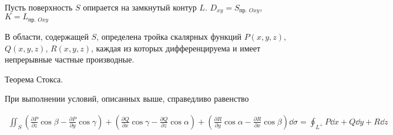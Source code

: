 
\begin{multicols}{2}
  
  \columnbreak

  Пусть поверхность \(S\) опирается на замкнутый контур \(L\).
  \(D_{xy} = S_{\text{пр. } Oxy}\), \(K = L_{\text{пр. } Oxy}\)
  
  В области, содержащей \(S\), определена тройка скалярных функций
  \(P(x, y, z)\), \(Q(x, y, z)\), \(R(x, y, z)\), каждая из которых
  дифференцируема и имеет непрерывные частные производные.
\end{multicols}
  
\begin{theorem}\label{ST}
  Теорема Стокса.

  При выполнении условий, описанных выше, справедливо равенство
  
  \begin{align*}
    \iint_{S}
      \left(
        \frac{\partial P}{\partial z} \cos \beta
        - \frac{\partial P}{\partial y} \cos \gamma
      \right)
      + \left(
        \frac{\partial Q}{\partial x} \cos \gamma
        - \frac{\partial Q}{\partial z} \cos \alpha
      \right)
      + \left(
        \frac{\partial R}{\partial y} \cos \alpha
        - \frac{\partial R}{\partial x} \cos \beta
      \right) \dd \sigma
    = \oint_{L^{+}} P \dd x + Q \dd y + R \dd z
  \end{align*}
\end{theorem}  
